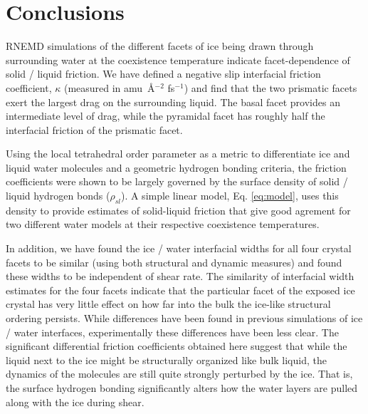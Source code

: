 \section{Conclusions}
RNEMD simulations of the different facets of ice being drawn through
surrounding water at the coexistence temperature indicate
facet-dependence of solid / liquid friction.  We have defined a
negative slip interfacial friction coefficient, $\kappa$ (measured in
amu~\AA$^{-2}$ fs$^{-1}$) and find that the two prismatic facets exert
the largest drag on the surrounding liquid.  The basal facet provides
an intermediate level of drag, while the pyramidal facet has roughly
half the interfacial friction of the prismatic facet.

Using the local tetrahedral order parameter as a metric to
differentiate ice and liquid water molecules and a geometric hydrogen
bonding criteria, the friction coefficients were shown to be largely
governed by the surface density of solid / liquid hydrogen bonds
($\rho_{sl}$).  A simple linear model, Eq. \eqref{eq:model}, uses
this density to provide estimates of solid-liquid friction that give
good agrement for two different water models at their respective
coexistence temperatures.

In addition, we have found the ice / water interfacial widths for all
four crystal facets to be similar (using both structural and dynamic
measures) and found these widths to be independent of shear rate.  The
similarity of interfacial width estimates for the four facets indicate
that the particular facet of the exposed ice crystal has very little
effect on how far into the bulk the ice-like structural ordering
persists. While differences have been found in previous simulations of
ice / water interfaces,\cite{Hayward2001,Hayward2002} experimentally
these differences have been less clear.\cite{Beaglehole1993} The
significant differential friction coefficients obtained here suggest
that while the liquid next to the ice might be structurally organized
like bulk liquid, the dynamics of the molecules are still quite
strongly perturbed by the ice.  That is, the surface hydrogen bonding
significantly alters how the water layers are pulled along with the
ice during shear.


